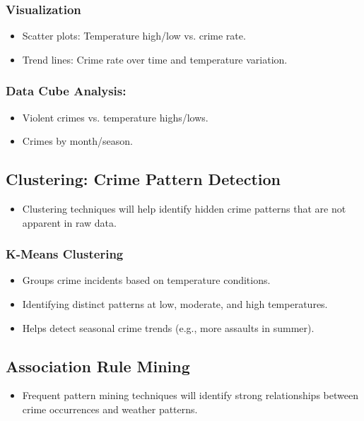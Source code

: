 \documentclass[sigconf,twocolumn,11pt]{acmart}
\begin{document}
\subsubsection{Visualization}
\begin{itemize}
    \item Scatter plots: Temperature high/low vs. crime rate.
    \item Trend lines: Crime rate over time and temperature variation.
\end{itemize}
\subsubsection{Data Cube Analysis:}
\begin{itemize}
    \item Violent crimes vs. temperature highs/lows.
    \item Crimes by month/season.

\end{itemize}

\subsection{Clustering: Crime Pattern Detection}
\begin{itemize}
    \item Clustering techniques will help identify hidden crime patterns that are not apparent in raw data.
\end{itemize}
\subsubsection{K-Means Clustering}
\begin{itemize}
    \item Groups crime incidents based on temperature conditions.
    \item Identifying distinct patterns at low, moderate, and high temperatures.
    \item Helps detect seasonal crime trends (e.g., more assaults in summer).

\end{itemize}

\subsection{Association Rule Mining}
\begin{itemize}
    \item Frequent pattern mining techniques will identify strong relationships between crime occurrences and weather patterns.
\end{itemize}
\end{document}
